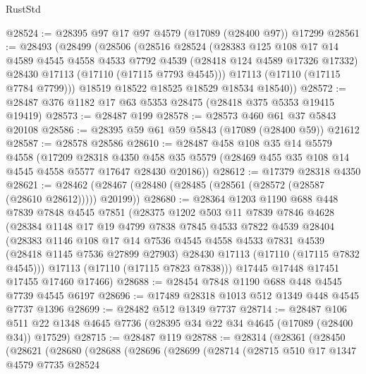 \begin{lexlean}{RustStd}
\begin{coremodule}
@28524 := @28395 @97 @17 @97 @4579 (@17089 (@28400 @97)) @17299
@28561 := @28493
    (@28499
      (@28506
        (@28516
          @28524
          (@28383
            @125
            @108
            @17
            @14
            @4589
            @4545
            @4558
            @4533
            @7792
            @4539
            (@28418 @124 @4589 @17326 @17332)
            @28430
            @17113
            (@17110 (@17115 @7793 @4545)))
          @17113
          (@17110 (@17115 @7784 @7799)))
        @18519
        @18522
        @18525
        @18529
        @18534
        @18540))
@28572 := @28487 @376 @1182 @17 @63 @5353 @28475 (@28418 @375 @5353 @19415 @19419)
@28573 := @28487 @199
@28578 := @28573 @460 @61 @37 @5843 @20108
@28586 := @28395 @59 @61 @59 @5843 (@17089 (@28400 @59)) @21612
@28587 := @28578 @28586
@28610 := @28487
    @458
    @108
    @35
    @14
    @5579
    @4558
    (@17209
      @28318
      @4350
      @458
      @35
      @5579
      (@28469 @455 @35 @108 @14 @4545 @4558 @5577 @17647 @28430 @20186))
@28612 := @17379 @28318 @4350
@28621 := @28462 (@28467 (@28480 (@28485 (@28561 (@28572 (@28587 (@28610 @28612))))) @20199))
@28680 := @28364
    @1203
    @1190
    @688
    @448
    @7839
    @7848
    @4545
    @7851
    (@28375
      @1202
      @503
      @11
      @7839
      @7846
      @4628
      (@28384
        @1148
        @17
        @19
        @4799
        @7838
        @7845
        @4533
        @7822
        @4539
        @28404
        (@28383
          @1146
          @108
          @17
          @14
          @7536
          @4545
          @4558
          @4533
          @7831
          @4539
          (@28418 @1145 @7536 @27899 @27903)
          @28430
          @17113
          (@17110 (@17115 @7832 @4545)))
        @17113
        (@17110 (@17115 @7823 @7838)))
      @17445
      @17448
      @17451
      @17455
      @17460
      @17466)
@28688 := @28454 @7848 @1190 @688 @448 @4545 @7739 @4545 @6197
@28696 := @17489 @28318 @1013 @512 @1349 @448 @4545 @7737 @1396
@28699 := @28482 @512 @1349 @7737
@28714 := @28487
    @106
    @511
    @22
    @1348
    @4645
    @7736
    (@28395 @34 @22 @34 @4645 (@17089 (@28400 @34)) @17529)
@28715 := @28487 @119
@28788 := @28314
    (@28361
      (@28450
        (@28621
          (@28680
            (@28688
              (@28696
                (@28699
                  (@28714
                    (@28715
                      @510
                      @17
                      @1347
                      @4579
                      @7735
                      @28524

\end{coremodule}
\end{lexlean}
